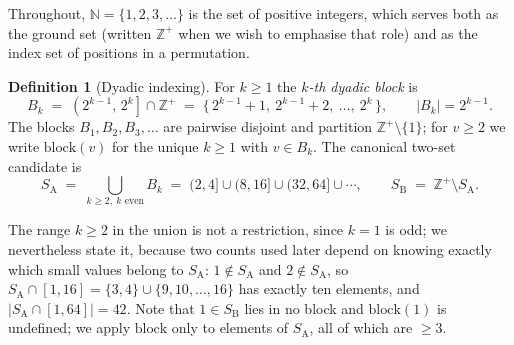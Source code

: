 \documentclass[11pt]{article}
\theoremstyle{definition}
\newtheorem{definition}[theorem]{Definition}
\newcommand{\Z}{\mathbb{Z}}
\newcommand{\N}{\mathbb{N}}
\newcommand{\SA}{S_{\mathrm{A}}}
\newcommand{\SB}{S_{\mathrm{B}}}
\begin{document}
Throughout, $\N = \{1, 2, 3, \dots\}$ is the set of positive integers, which
serves both as the ground set (written $\Z^+$ when we wish to emphasise that
role) and as the index set of positions in a permutation.

\begin{definition}[Dyadic indexing]\label{def:dyadic}
For $k \ge 1$ the \emph{$k$-th dyadic block} is
\[
B_k \;=\; \left(2^{k-1},\, 2^{k}\right] \cap \Z^+
\;=\; \{\, 2^{k-1}+1,\ 2^{k-1}+2,\ \dots,\ 2^{k} \,\},
\qquad |B_k| = 2^{k-1}.
\]
The blocks $B_1, B_2, B_3, \dots$ are pairwise disjoint and partition
$\Z^+ \setminus \{1\}$; for $v \ge 2$ we write $\mathrm{block}(v)$ for the
unique $k \ge 1$ with $v \in B_k$. The canonical two-set candidate is
\[
\SA \;=\; \bigcup_{k \ge 2,\ k \text{ even}} B_k
\;=\; (2,4] \cup (8,16] \cup (32,64] \cup \cdots,
\qquad
\SB{} \;=\; \Z^+ \setminus \SA .
\]
\end{definition}

\noindent The range $k \ge 2$ in the union is not a restriction, since
$k = 1$ is odd; we nevertheless state it, because two counts used later
depend on knowing exactly which small values belong to $\SA$: $1 \notin \SA$
and $2 \notin \SA$, so $\SA \cap [1,16] = \{3,4\} \cup \{9, 10, \dots, 16\}$
has exactly ten elements, and $|\SA \cap [1,64]| = 42$. Note that
$1 \in \SB{}$ lies in no block and $\mathrm{block}(1)$ is undefined; we apply
$\mathrm{block}$ only to elements of $\SA$, all of which are $\ge 3$.
\end{document}
